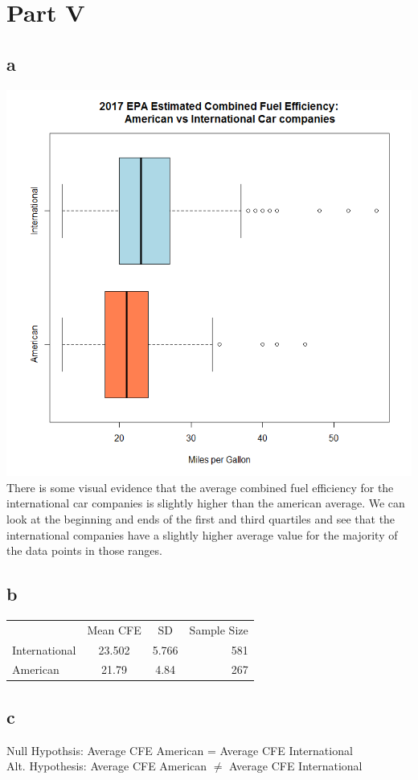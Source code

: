 \documentclass[10pt,letterpaper]{article}
\begin{document}
\section*{Part V}
\subsection*{a}
\includegraphics[scale=.5]{fuel-box}\\
There is some visual evidence that the average combined fuel efficiency for the
international car companies is slightly higher than the american average. We can
look at the beginning and ends of the first and third quartiles and see that
the international companies have a slightly higher average value for the
majority of the data points in those ranges.

\subsection*{b}
\begin{center}
	\begin{tabular}{l | c | c | r}
		 & Mean CFE & SD & Sample Size \\
		International & 23.502 & 5.766 & 581 \\
		American & 21.79 & 4.84  & 267
	\end{tabular}
\end{center}
\subsection*{c}
Null Hypothsis: Average CFE American = Average CFE International\\
Alt. Hypothesis: Average CFE American $\neq$ Average CFE International
\end{document}
